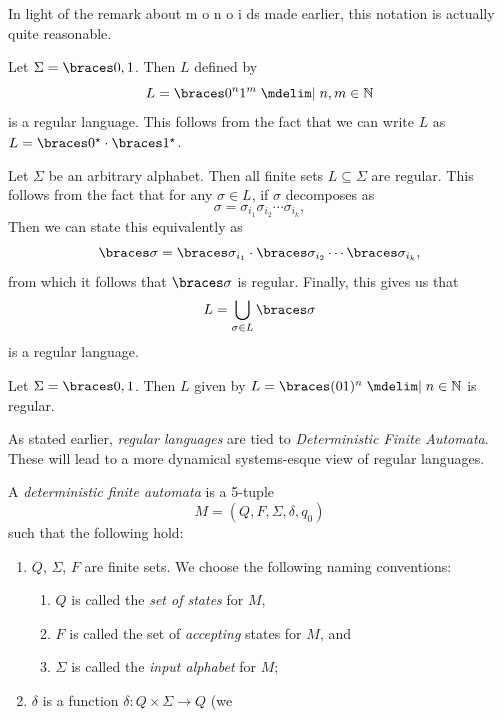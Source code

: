\documentclass{fkpaper}
\begin{document}
\begin{multicols}{2}
\begin{definition}
\[  \]
\end{definition}
In light of the remark about {\color{red} m} {\color{orange} o}
{\color{yellow} n} {\color{green} o} {\color{blue} i} {\color{purple}
  d}s made earlier, this notation is actually quite reasonable.
\begin{example}\label{ex:dfa-example}
  Let $\Sigma = \set{0,1}$. Then $L$ defined by
  \[
    L = \set{0^n 1^m \MID n,m \in \NN}
  \]
  is a regular language. This follows from the fact that we can write
  $L$ as $L = \set{0}^\star \cdot \set{1}^\star$.
\end{example}
\begin{example}
  Let $\Sigma$ be an arbitrary alphabet. Then all finite sets $L
  \subseteq \Sigma$ are regular. This follows from the fact that for
  any $\sigma\in L$, if $\sigma$ decomposes as
  \[
    \sigma = \sigma_{i_1} \sigma_{i_2} \cdots \sigma_{i_k},
  \]
  Then we can state this equivalently as
  \[
    \set{\sigma} = \set{\sigma_{i_1}} \cdot \set{\sigma_{i_2}} \cdots
    \set{\sigma_{i_k}},
  \]
  from which it follows that $\set{\sigma}$ is regular. Finally, this
  gives us that
  \[
    L = \bigcup_{\sigma \in L} \set{\sigma}
  \]
  is a regular language.
\end{example}
\begin{example}
  Let $\Sigma = \set{0,1}$. Then $L$ given by $L = \set{(01)^n \MID n
    \in \NN}$ is regular.
\end{example}
As stated earlier, \emph{regular languages} are tied to
\emph{Deterministic Finite Automata}. These will lead to a more
dynamical systems-esque view of regular languages.
\begin{definition}\label{def:dfa}
  A \emph{deterministic finite automata} is a 5-tuple
  \[
    M = (Q, F, \Sigma, \delta, q_0)
  \]
  such that the following hold:
  \begin{enumerate}
    \item $Q$, $\Sigma$, $F$ are finite sets. We choose the following
      naming conventions:
      \begin{enumerate}[label=\roman*)]
        \item $Q$ is called the \emph{set of states} for $M$,
        \item $F$ is called the set of \emph{accepting} states for
          $M$, and
        \item $\Sigma$ is called the \emph{input alphabet} for $M$;
      \end{enumerate}
    \item $\delta$ is a function $\delta : Q \times \Sigma \to Q$ (we

\end{enumerate}
\end{definition}
\end{multicols}
\end{document}
